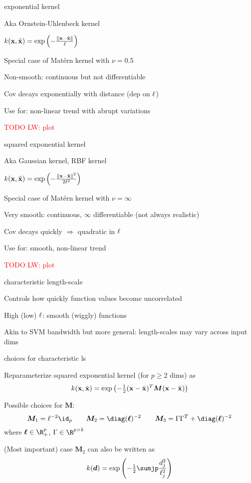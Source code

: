 \documentclass[11pt,compress,t,notes=noshow, xcolor=table]{beamer}
\begin{document}
\begin{framei}{exponential kernel}
\item Aka Ornstein-Uhlenbeck kernel
\item $k(\mathbf{x}, \tilde{\mathbf{x}}) = \exp \left(-\frac{\| \mathbf{x} - \tilde{\mathbf{x}} \|}{\ell} \right)$
\item Special case of Matérn kernel with $\nu = 0.5$
\item Non-smooth: continuous but not differentiable
\item Cov decays exponentially with distance (dep on $\ell$)
\item Use for: non-linear trend with abrupt variations
\item \textcolor{red}{TODO LW: plot}
\end{framei}

\begin{framei}{squared exponential kernel}
\item Aka Gaussian kernel, RBF kernel
\item $k(\mathbf{x}, \tilde{\mathbf{x}}) = \exp \left(-\frac{\| \mathbf{x} - \tilde{\mathbf{x}} \|^2}{2\ell^2} \right)$
\item Special case of Matérn kernel with $\nu = \infty$
\item Very smooth: continuous, $\infty$ differentiable (not always realistic)
\item Cov decays quickly $\Rightarrow$ quadratic in $\ell$
\item Use for: smooth, non-linear trend
\item \textcolor{red}{TODO LW: plot}
\end{framei}

\begin{framei}[sep=L]{characteristic length-scale}
\item Controls how quickly function values become uncorrelated
\item High (low) $\ell$: smooth (wiggly) functions
\vfill
{}
\item Akin to SVM bandwidth but more general: length-scales may vary across input dims
\end{framei}

\begin{framei}[sep=L]{choices for characteristic ls}
\item Reparameterize squared exponential kernel (for $p \geq 2$ dims) as
$$
k(\mathbf{x}, \tilde{\mathbf{x}}) = \exp \left(- \tfrac{1}{2}(\mathbf{x} - \tilde{\mathbf{x}})^T\bm{M} (\mathbf{x} - \tilde{\mathbf{x}} )\right)
$$
\item Possible choices for $\bm{M}$:
$$
\bm{M}_1 = \ls^{-2}\id_p \qquad \bm{M}_2 = \diag(\bm{\ls})^{-2} \qquad \bm{M}_3 = \Gamma \Gamma^T + \diag(\bm{\ls})^{-2}
$$
where $\bm{\ls} \in \R^p_+$, $\Gamma \in \R^{p \times k}$ 
\item (Most important) case $\bm{M}_2$ can also be written as
$$
  k(\bm{d}) = \exp \left(- \tfrac{1}{2} \sumjp \frac{d_j^2}{\ell_j^2} \right)
$$
\end{framei}
\end{document}
